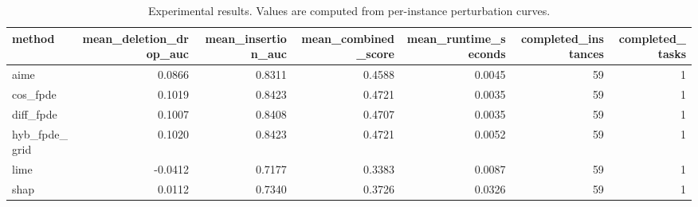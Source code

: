 \begin{table}[t]
\caption{Experimental results. Values are computed from per-instance perturbation curves.}
\label{tab:main_results_computed}
\centering
\begin{tabular}{lrrrrrr}
\toprule
method & mean\_deletion\_drop\_auc & mean\_insertion\_auc & mean\_combined\_score & mean\_runtime\_seconds & completed\_instances & completed\_tasks \\
\midrule
aime & 0.0866 & 0.8311 & 0.4588 & 0.0045 & 59 & 1 \\
cos\_fpde & 0.1019 & 0.8423 & 0.4721 & 0.0035 & 59 & 1 \\
diff\_fpde & 0.1007 & 0.8408 & 0.4707 & 0.0035 & 59 & 1 \\
hyb\_fpde\_grid & 0.1020 & 0.8423 & 0.4721 & 0.0052 & 59 & 1 \\
lime & -0.0412 & 0.7177 & 0.3383 & 0.0087 & 59 & 1 \\
shap & 0.0112 & 0.7340 & 0.3726 & 0.0326 & 59 & 1 \\
\bottomrule
\end{tabular}

\end{table}
